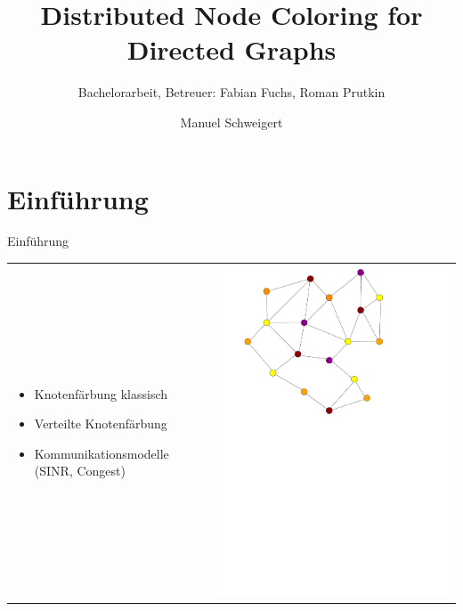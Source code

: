 \documentclass[18pt]{beamer}
\title[Distributed Node Coloring for Directed Graphs]{Distributed Node Coloring for Directed Graphs}
\subtitle{Bachelorarbeit, Betreuer: Fabian Fuchs, Roman Prutkin}
\author{Manuel Schweigert}
\institute{Institut für Theoretische Informatik}
\begin{document}

\begin{frame}
\titlepage
\end{frame}

\section{Einführung}
\begin{frame}{Einführung}
\begin{tabular}{l l}
\begin{minipage}{0.5\textwidth}
	\begin{itemize}
		\item Knotenfärbung klassisch
		\item Verteilte Knotenfärbung
		\item Kommunikationsmodelle (SINR, Congest)
	\end{itemize}
\end{minipage}
&
\begin{minipage}{0.45\textwidth}
\includegraphics[width=\textwidth]{pdf/nodecoloring.pdf}
\end{minipage}
\end{tabular}
\end{frame}
\end{document}
